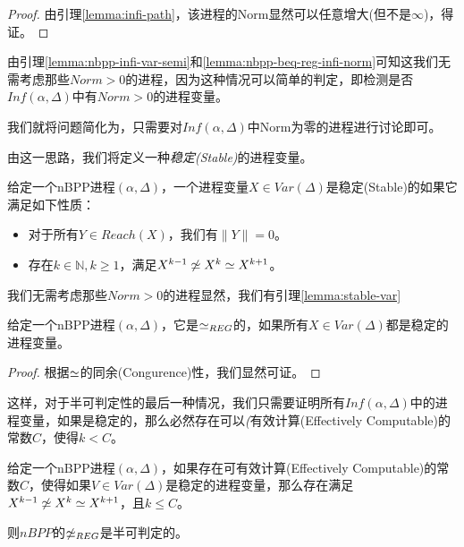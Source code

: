\begin{proof}
由引理\ref{lemma:infi-path}，该进程的Norm显然可以任意增大(但不是$\infty$)，得证。
\end{proof}

由引理\ref{lemma:nbpp-infi-var-semi}和\ref{lemma:nbpp-beq-reg-infi-norm}可知这我们无需考虑那些$Norm>0$的进程，因为这种情况可以简单的判定，即检测是否$Inf(\alpha,\Delta)$中有$Norm>0$的进程变量。

我们就将问题简化为，只需要对$Inf(\alpha,\Delta)$中Norm为零的进程进行讨论即可。

由这一思路，我们将定义一种\emph{稳定(Stable)}的进程变量。

\begin{defn}\label{def:stable-var}
给定一个nBPP进程$(\alpha,\Delta)$，一个进程变量$X \in Var(\Delta)$是稳定(Stable)的如果它满足如下性质：
\begin{itemize}
	\item 对于所有$Y\in Reach(X)$，我们有$\|Y\|=0$。
	\item 存在$k\in \mathbb{N},k\geq 1$，满足$X^{k-1}\not\simeq X^k\simeq X^{k+1}$。
\end{itemize}
\end{defn}

我们无需考虑那些$Norm>0$的进程显然，我们有引理\ref{lemma:stable-var}

\begin{lem}\label{lemma:stable-var}
给定一个nBPP进程$(\alpha,\Delta)$，它是$\simeq_{REG}$的，如果所有$X\in Var(\Delta)$都是稳定的进程变量。
\end{lem}

\begin{proof}
根据$\simeq$的同余(Congurence)性，我们显然可证。
\end{proof}

这样，对于半可判定性的最后一种情况，我们只需要证明所有$Inf(\alpha,\Delta)$中的进程变量，如果是稳定的，那么必然存在可以\emph(有效计算(Effectively Computable)的常数$C$，使得$k<C$。

\begin{lem}\label{lemma:term}
给定一个nBPP进程$(\alpha,\Delta)$，如果存在可有效计算(Effectively Computable)的常数$C$，使得如果$V\in Var(\Delta)$是稳定的进程变量，那么存在满足$X^{k-1}\not\simeq X^k\simeq X^{k+1}$，且$k\leq C$。

则$nBPP$的$\not\simeq_{REG}$是半可判定的。
\end{lem}


